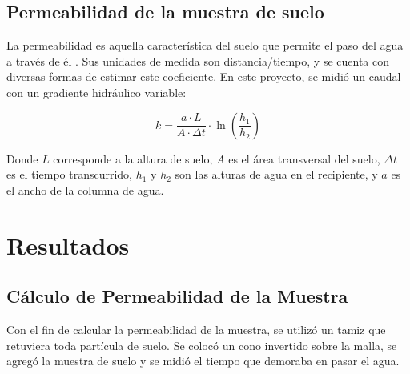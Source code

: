 \subsection{Permeabilidad de la muestra de suelo}

La permeabilidad es aquella característica del suelo que permite el paso del agua a través de él \citep{permeabilidad_suelos}. Sus unidades de medida son distancia/tiempo, y se cuenta con diversas formas de estimar este coeficiente. En este proyecto, se midió un caudal con un gradiente hidráulico variable:

\begin{equation}
    k = \frac{a \cdot L}{A \cdot \Delta t} \cdot \ln\left(\frac{h_1}{h_2}\right)
\end{equation}

Donde \(L\) corresponde a la altura de suelo, \(A\) es el área transversal del suelo, \(\Delta t\) es el tiempo transcurrido, \(h_1\) y \(h_2\) son las alturas de agua en el recipiente, y \(a\) es el ancho de la columna de agua.

\newpage
\section{Resultados}

\subsection{Cálculo de Permeabilidad de la Muestra}

Con el fin de calcular la permeabilidad de la muestra, se utilizó un tamiz que retuviera toda partícula de suelo. Se colocó un cono invertido sobre la malla, se agregó la muestra de suelo y se midió el tiempo que demoraba en pasar el agua.

